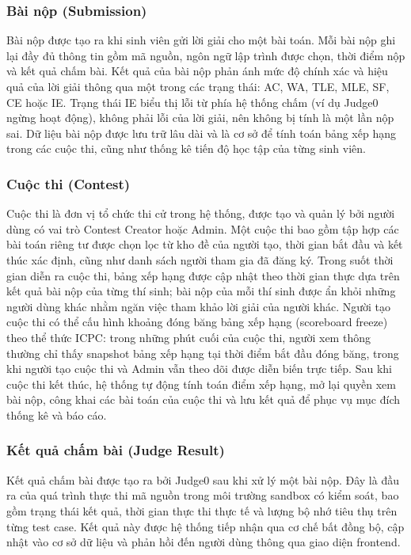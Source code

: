 \documentclass[12pt, a4paper]{report}
\begin{document}
\subsubsection{Bài nộp (Submission)}

Bài nộp được tạo ra khi sinh viên gửi lời giải cho một bài toán. Mỗi bài nộp ghi lại đầy
đủ thông tin gồm mã nguồn, ngôn ngữ lập trình được chọn, thời điểm nộp và kết quả chấm
bài. Kết quả của bài nộp phản ánh mức độ chính xác và hiệu quả của lời giải thông qua một
trong các trạng thái: \ac{AC}, \ac{WA}, \ac{TLE}, \ac{MLE}, \ac{SF}, \ac{CE} hoặc \ac{IE}.
Trạng thái \ac{IE} biểu thị lỗi từ phía hệ thống chấm (ví dụ Judge0 ngừng hoạt động), không
phải lỗi của lời giải, nên không bị tính là một lần nộp sai. Dữ liệu
bài nộp được lưu trữ lâu dài và là cơ sở để tính toán bảng xếp hạng trong các cuộc thi,
cũng như thống kê tiến độ học tập của từng sinh viên.

\subsubsection{Cuộc thi (Contest)}

Cuộc thi là đơn vị tổ chức thi cử trong hệ thống, được tạo và quản lý bởi người dùng có
vai trò Contest Creator hoặc Admin. Một cuộc thi bao gồm tập hợp các bài toán riêng tư
được chọn lọc từ kho đề của người tạo, thời gian bắt đầu và kết thúc xác định, cũng như
danh sách người tham gia đã đăng ký. Trong suốt thời gian diễn ra cuộc thi, bảng xếp hạng
được cập nhật theo thời gian thực dựa trên kết quả bài nộp của từng thí sinh; bài nộp của
mỗi thí sinh được ẩn khỏi những người dùng khác nhằm ngăn việc tham khảo lời giải của người khác. 
Người tạo cuộc thi có thể cấu hình khoảng đóng băng bảng xếp hạng (scoreboard freeze) 
theo thể thức \ac{ICPC}: trong những phút cuối của cuộc thi, người xem thông
thường chỉ thấy snapshot bảng xếp hạng tại thời điểm bắt đầu đóng băng, trong khi người
tạo cuộc thi và Admin vẫn theo dõi được diễn biến trực tiếp. Sau khi cuộc thi kết thúc,
hệ thống tự động tính toán điểm xếp hạng, mở lại quyền xem bài nộp, công khai các bài
toán của cuộc thi và lưu kết quả để phục vụ mục đích thống kê và báo cáo.

\subsubsection{Kết quả chấm bài (Judge Result)}

Kết quả chấm bài được tạo ra bởi Judge0 sau khi xử lý một bài nộp. Đây là đầu ra của quá
trình thực thi mã nguồn trong môi trường sandbox có kiểm soát, bao gồm trạng thái kết quả,
thời gian thực thi thực tế và lượng bộ nhớ tiêu thụ trên từng test case. Kết quả này được
hệ thống tiếp nhận qua cơ chế bất đồng bộ, cập nhật vào cơ sở dữ liệu và phản hồi đến
người dùng thông qua giao diện frontend.
\end{document}
